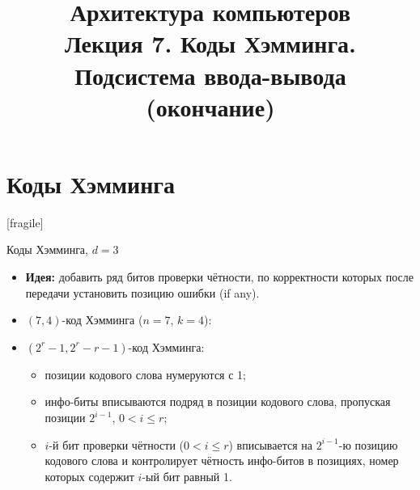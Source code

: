 \newcommand{\h}{handout,}



\title[Коды Хэмминга. Подсистема I/O (2)]{Архитектура компьютеров\texorpdfstring{\\}{ }Лекция 7. Коды Хэмминга.\texorpdfstring{\\}{ }Подсистема ввода-вывода (окончание)}



\begin{frame}
\titlepage
\end{frame}

\section{Коды Хэмминга}[fragile]

\begin{frame}{Коды Хэмминга, $d=3$}
\begin{itemize}[<+->]

    \item \textbf{Идея:} добавить ряд битов проверки чётности, по
        корректности
        которых после передачи установить позицию ошибки (if any).

    \item
            $(7, 4)$-код Хэмминга ($n = 7$, $k = 4$):


    \item $(2^r - 1, 2^r - r - 1)$-код Хэмминга: \\
    \begin{itemize}
        \item позиции кодового слова нумеруются с 1;

        \item инфо-биты вписываются подряд в позиции
            кодового слова, пропуская позиции $2^{i-1}$, $0 < i \leqslant r$;

        \item $i$-й бит проверки чётности ($0 < i \leqslant r$)
            вписывается на $2^{i-1}$-ю
            позицию кодового слова и контролирует чётность инфо-битов
            в позициях, номер которых содержит $i$-ый бит равный 1.
    \end{itemize}
\end{itemize}
\end{frame}

